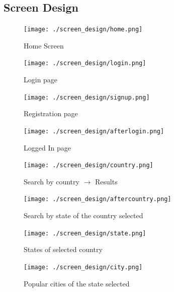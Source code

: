 \documentclass[a4paper,11pt]{article}
\begin{document}
\subsection{Screen Design}
\begin{figure}[ht!]
\hfill\texttt{[image: ./screen\_design/home.png]}\hspace*{\fill}
\caption{Home Screen}
\end{figure}

\begin{figure}[ht!]
\hfill\texttt{[image: ./screen\_design/login.png]}\hspace*{\fill}
\caption{Login page}
\end{figure}

\begin{figure}[ht!]
\hfill\texttt{[image: ./screen\_design/signup.png]}\hspace*{\fill}
\caption{Registration page}
\end{figure}

\begin{figure}[ht!]
\hfill\texttt{[image: ./screen\_design/afterlogin.png]}\hspace*{\fill}
\caption{Logged In page}
\end{figure}

\begin{figure}[ht!]
\hfill\texttt{[image: ./screen\_design/country.png]}\hspace*{\fill}
\caption{Search by country $\rightarrow$ Results}
\end{figure}

\begin{figure}[ht!]
\hfill\texttt{[image: ./screen\_design/aftercountry.png]}\hspace*{\fill}
\caption{Search by state of the country selected}
\end{figure}

\begin{figure}[ht!]
\hfill\texttt{[image: ./screen\_design/state.png]}\hspace*{\fill}
\caption{States of selected country}
\end{figure}

\begin{figure}[ht!]
\hfill\texttt{[image: ./screen\_design/city.png]}\hspace*{\fill}
\caption{Popular cities of the state selected}
\end{figure}
\end{document}
